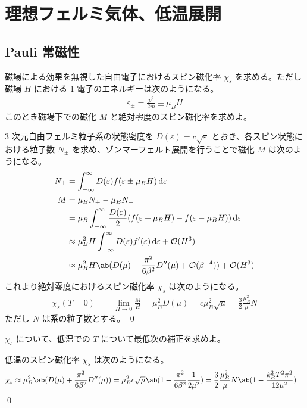\documentclass[uplatex,dvipdfmx,a4paper,11pt]{jlreq}
\makeatletter
\numberwithin{equation}{section}
\theoremstyle{definition}
\renewenvironment{proof}[1][\proofname]{\par
  \normalfont
  \topsep6\p@\@plus6\p@ \trivlist
  \item[\hskip\labelsep{\bfseries #1}\@addpunct{\bfseries}]\ignorespaces\quad\par
}{%
  \qed\endtrivlist\@endpefalse
}
\renewcommand\proofname{証明}
\makeatother
\begin{document}
\section{理想フェルミ気体、低温展開}
\setcounter{subsection}{3}
\subsection{Pauli 常磁性}
\begin{problem}
磁場による効果を無視した自由電子におけるスピン磁化率 $\chi_s$ を求める。ただし磁場 $H$ における 1 電子のエネルギーは次のようになる。
\begin{align}
  \varepsilon_{\pm} = \frac{p^2}{2m} \pm \mu_BH
\end{align}
このとき磁場下での磁化 $M$ と絶対零度のスピン磁化率を求めよ。
\end{problem}
\begin{proof}
  3 次元自由フェルミ粒子系の状態密度を $D(\varepsilon) = c\sqrt{\varepsilon}$ とおき、各スピン状態における粒子数 $N_\pm$ を求め、ゾンマーフェルト展開を行うことで磁化 $M$ は次のようになる。
  \begin{align}
    N_\pm & = \int_{-\infty}^{\infty}D(\varepsilon)f(\varepsilon \pm \mu_BH)\dl{\varepsilon}                                          \\
    M     & = \mu_BN_+ - \mu_BN_-                                                                                                     \\
          & = \mu_B\int_{-\infty}^{\infty}\frac{D(\varepsilon)}{2}(f(\varepsilon + \mu_BH) - f(\varepsilon - \mu_BH))\dl{\varepsilon} \\
          & \approx \mu_B^2H\int_{-\infty}^{\infty}D(\varepsilon)f'(\varepsilon)\dl{\varepsilon} + \mathcal{O}(H^3)                   \\
          & \approx \mu_B^2H\ab(D(\mu) + \frac{\pi^2}{6\beta^2}D''(\mu) + \mathcal{O}(\beta^{-4})) + \mathcal{O}(H^3)
  \end{align}
  これより絶対零度におけるスピン磁化率 $\chi_s$ は次のようになる。
  \begin{align}
    \chi_s(T=0) & = \lim_{H\to 0}\frac{M}{H} = \mu_B^2D(\mu) = c\mu_B^2\sqrt{\mu} = \frac{3}{2}\frac{\mu_B^2}{\mu}N
  \end{align}
  ただし $N$ は系の粒子数とする。
\end{proof}

\begin{problem}
$\chi_s$ について、低温での $T$ について最低次の補正を求めよ。
\end{problem}
\begin{proof}
  低温のスピン磁化率 $\chi_s$ は次のようになる。
  \begin{align}
    \chi_s & \approx \mu_B^2\ab(D(\mu) + \frac{\pi^2}{6\beta^2}D''(\mu)) = \mu_B^2c\sqrt{\mu}\ab(1 - \frac{\pi^2}{6\beta^2}\frac{1}{2\mu^2}) = \frac{3}{2}\frac{\mu_B^2}{\mu}N\ab(1 - \frac{k_B^2T^2\pi^2}{12\mu^2})
  \end{align}
\end{proof}
\end{document}
